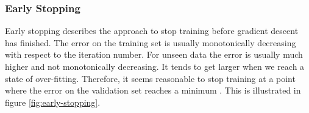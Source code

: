 \subsubsection{Early Stopping}

Early stopping describes the approach to stop training before gradient descent has finished. The error on the training set is usually monotonically decreasing with respect to the iteration number. For unseen data the error is usually much higher and not monotonically decreasing. It tends to get larger when we reach a state of over-fitting. Therefore, it seems reasonable to stop training at a point where the error on the validation set reaches a minimum \cite[p.~343-345]{Bishop:1995}. This is illustrated in figure \ref{fig:early-stopping}.


